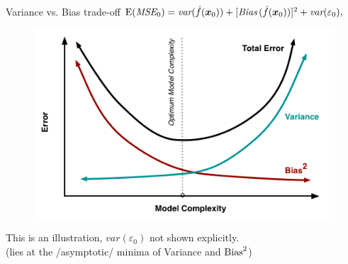 \documentclass{beamer}
\begin{document}
\begin{frame}{Variance vs. Bias trade-off}
$\textnormal{E}(\textit{MSE}_0)
   = \textit{var}(\hat{f}(\bm{x}_0))
   + [\textit{Bias\,}(\hat{f}(\bm{x}_0))]^2
   + \textit{var}(\varepsilon_0),$\\
\begin{figure}
\includegraphics[angle=0,scale=0.35]{img/biasvariance.png}
\end{figure}
\small{This is an illustration, $\textit{var}(\varepsilon_0)$ not shown explicitly. \\(lies at the /asymptotic/ minima of Variance and $\textnormal{Bias}^2$)}
\end{frame}
\end{document}
